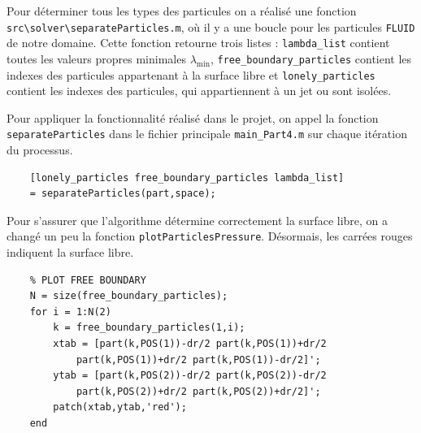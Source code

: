 \documentclass{article}
\begin{document}
Pour déterminer tous les types des particules on a réalisé une fonction \lstinline$src\solver\separateParticles.m$, où il y a une boucle pour les particules \lstinline$FLUID$ de notre domaine. Cette fonction retourne trois listes : \lstinline$lambda_list$ contient toutes les valeurs propres minimales $\lambda_{\min}$, \lstinline$free_boundary_particles$ contient les indexes des particules appartenant à la surface libre et  \lstinline$lonely_particles$ contient les indexes des particules, qui appartiennent à un jet ou sont isolées.

Pour appliquer la fonctionnalité réalisé dans le projet, on appel la fonction \lstinline$separateParticles$ dans le fichier principale \lstinline$main_Part4.m$ sur chaque itération du processus. 
\begin{lstlisting}           
    [lonely_particles free_boundary_particles lambda_list] 
    = separateParticles(part,space);
\end{lstlisting} 

Pour s'assurer que l'algorithme détermine correctement la surface libre, on a changé un peu la fonction \lstinline$plotParticlesPressure$. Désormais, les carrées rouges indiquent la surface libre.  

\begin{lstlisting}
    % PLOT FREE BOUNDARY
    N = size(free_boundary_particles);
    for i = 1:N(2)
        k = free_boundary_particles(1,i);
        xtab = [part(k,POS(1))-dr/2 part(k,POS(1))+dr/2 
            part(k,POS(1))+dr/2 part(k,POS(1))-dr/2]';
        ytab = [part(k,POS(2))-dr/2 part(k,POS(2))-dr/2 
            part(k,POS(2))+dr/2 part(k,POS(2))+dr/2]';
        patch(xtab,ytab,'red');
    end
\end{lstlisting} 
\end{document}
